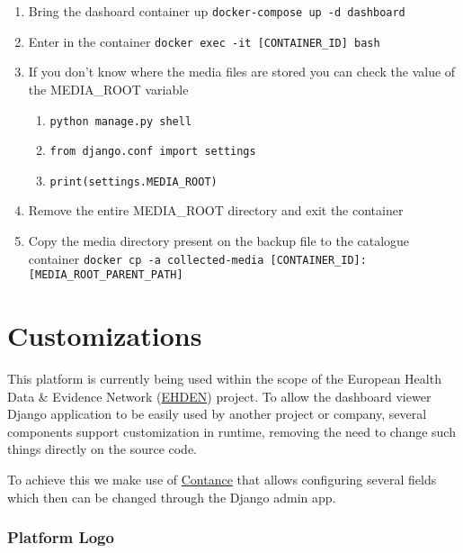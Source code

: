 \documentclass[
]{book}
\begin{document}
\begin{enumerate}
\begin{enumerate}
    \begin{enumerate}
    \def\labelenumiii{\arabic{enumiii}.}
    \item
      Bring the dashoard container up \texttt{docker-compose\ up\ -d\ dashboard}
    \item
      Enter in the container \texttt{docker\ exec\ -it\ {[}CONTAINER\_ID{]}\ bash}
    \item
      If you don't know where the media files are stored you can check the value of the MEDIA\_ROOT variable

      \begin{enumerate}
      \def\labelenumiv{\arabic{enumiv}.}
      \item
        \texttt{python\ manage.py\ shell}
      \item
        \texttt{from\ django.conf\ import\ settings}
      \item
        \texttt{print(settings.MEDIA\_ROOT)}
      \end{enumerate}
    \item
      Remove the entire MEDIA\_ROOT directory and exit the container
    \item
      Copy the media directory present on the backup file to the catalogue container \texttt{docker\ cp\ -a\ collected-media\ {[}CONTAINER\_ID{]}:{[}MEDIA\_ROOT\_PARENT\_PATH{]}}
    \end{enumerate}
  \end{enumerate}
\end{enumerate}

\hypertarget{customizations}{%
\chapter{Customizations}\label{customizations}}

This platform is currently being used within the scope of the European Health Data \& Evidence Network (\href{https://www.ehden.eu/}{EHDEN}) project.
To allow the dashboard viewer Django application to be easily used by another project or company, several components support customization in runtime, removing the need to change such things directly on the source code.

To achieve this we make use of \href{https://github.com/jazzband/django-constance}{Contance} that allows configuring several fields which then can be changed through the Django admin app.

\hypertarget{platform-logo}{%
\subsection*{Platform Logo}\label{platform-logo}}
\end{document}
